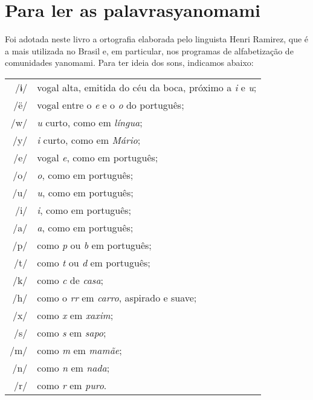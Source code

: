 \chapter[Para ler as palavras yanomami]{Para ler as palavras\break yanomami}

Foi adotada neste livro a ortografia elaborada pelo linguista Henri Ramirez, que é a mais utilizada no Brasil e, em particular, nos programas de alfabetização de comunidades yanomami. Para ter ideia dos sons, indicamos abaixo:

\bigskip

\begingroup
\begin{tabular}{rl}
/ɨ/ & vogal alta, emitida do céu da boca, próximo a \textit{i} e \textit{u};\\
/ë/ & vogal entre o \textit{e} e o \textit{o} do português;\\
/w/ & \textit{u} curto, como em \textit{língua};\\
/y/ & \textit{i} curto, como em \textit{Mário};\\
/e/ & vogal \textit{e}, como em português;\\
/o/ & \textit{o}, como em português;\\
/u/ & \textit{u}, como em português;\\
/i/ & \textit{i}, como em português;\\
/a/ & \textit{a}, como em português;\\
/p/ & como \textit{p} ou \textit{b} em português;\\
/t/ & como \textit{t} ou \textit{d} em português;\\
/k/ & como \textit{c} de \textit{casa};\\
/h/ & como o \textit{rr} em \textit{carro}, aspirado e suave;\\
/x/ & como \textit{x} em \textit{xaxim};\\
/s/ & como \textit{s} em \textit{sapo};\\
/m/ & como \textit{m} em \textit{mamãe};\\
/n/ & como \textit{n} em \textit{nada};\\
/r/ & como \textit{r} em \textit{puro}.\\
\end{tabular}
\endgroup